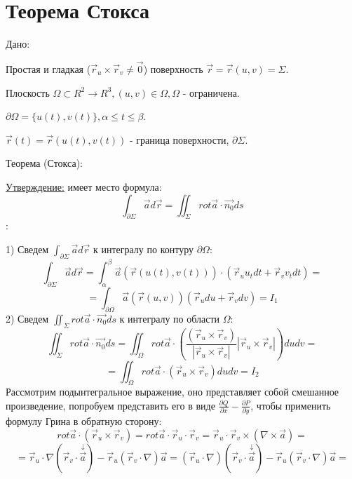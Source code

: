 \documentclass[12pt]{article}
\begin{document}
\section{Теорема Стокса}
Дано:\par
Простая и гладкая ($\overrightarrow{r}_u \times \overrightarrow{r}_v \neq \overrightarrow{0}$) поверхность $\overrightarrow{r} = \overrightarrow{r} (u,v) = \Sigma$.\par
Плоскость $\Omega \subset R^2 \to R^3, (u,v) \in \Omega, \Omega$ - ограничена.\par
$\partial \Omega = \{ u(t), v(t) \}, \alpha \leq t \leq \beta$.\par
$\overrightarrow{r}(t) = \overrightarrow{r}(u(t),v(t))$ - граница поверхности, $\partial \Sigma$.\par
Теорема (Стокса):\par
\uline{Утверждение:} имеет место формула:
$$\int_{\partial \Sigma} \overrightarrow{a} d \overrightarrow{r} = \iint_{\Sigma} rot \overrightarrow{a} \cdot \overrightarrow{n_0} ds$$
:\par
1) Сведем $\int_{\partial \Sigma} \overrightarrow{a} d \overrightarrow{r}$ к интегралу по контуру $\partial \Omega$:
$$\int_{\partial \Sigma} \overrightarrow{a} d \overrightarrow{r} = \int_{\alpha}^{\beta} \overrightarrow{a} (\overrightarrow{r}(u(t),v(t))) \cdot (\overrightarrow{r}_u u_t dt + \overrightarrow{r}_v v_t dt)=$$
$$= \int_{\partial \Omega} \overrightarrow{a} (\overrightarrow{r}(u,v)) (\overrightarrow{r}_u du + \overrightarrow{r}_v dv) = I_1$$
2) Сведем $\iint_{\Sigma} rot \overrightarrow{a} \cdot \overrightarrow{n_0} ds$ к интегралу по области $\Omega$:
$$\iint_{\Sigma} rot \overrightarrow{a} \cdot \overrightarrow{n_0} ds = \iint_{\Omega} rot \overrightarrow{a} \cdot (\frac{(\overrightarrow{r}_u \times \overrightarrow{r}_v)}{|\overrightarrow{r}_u \times \overrightarrow{r}_v|} |\overrightarrow{r}_u \times \overrightarrow{r}_v|) du dv =$$
$$= \iint_{\Omega} rot \overrightarrow{a} \cdot (\overrightarrow{r}_u \times \overrightarrow{r}_v) du dv = I_2$$
Рассмотрим подынтегральное выражение, оно представляет собой смешанное произведение, попробуем представить его в виде $\frac{\partial Q}{\partial x} - \frac{\partial P}{\partial y}$, чтобы применить формулу Грина в обратную сторону:
$$rot \overrightarrow{a} \cdot (\overrightarrow{r}_u \times \overrightarrow{r}_v) = rot \overrightarrow{a} \cdot \overrightarrow{r}_u \cdot \overrightarrow{r}_v = \overrightarrow{r}_u \cdot \overrightarrow{r}_v \times (\nabla \times \overrightarrow{a}) =$$
$$=\overrightarrow{r}_u \cdot \nabla (\overrightarrow{r}_v \cdot \overset{\downarrow}{\overrightarrow{a}}) - \overrightarrow{r}_u (\overrightarrow{r}_v \cdot \nabla) \overrightarrow{a} = (\overrightarrow{r}_u \cdot \nabla)(\overrightarrow{r}_v \cdot \overset{\downarrow}{\overrightarrow{a}}) - \overrightarrow{r}_u(\overrightarrow{r}_v \cdot \nabla) \overrightarrow{a}=$$
\end{document}
